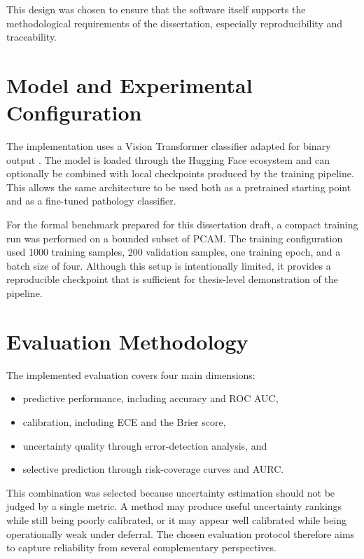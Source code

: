 This design was chosen to ensure that the software itself supports the methodological requirements of the dissertation, especially reproducibility and traceability.

\section{Model and Experimental Configuration}

The implementation uses a Vision Transformer classifier adapted for binary output \cite{dosovitskiy2021image}. The model is loaded through the Hugging Face ecosystem and can optionally be combined with local checkpoints produced by the training pipeline. This allows the same architecture to be used both as a pretrained starting point and as a fine-tuned pathology classifier.

For the formal benchmark prepared for this dissertation draft, a compact training run was performed on a bounded subset of PCAM. The training configuration used 1000 training samples, 200 validation samples, one training epoch, and a batch size of four. Although this setup is intentionally limited, it provides a reproducible checkpoint that is sufficient for thesis-level demonstration of the pipeline.

\section{Evaluation Methodology}

The implemented evaluation covers four main dimensions:

\begin{itemize}
    \item predictive performance, including accuracy and ROC AUC,
    \item calibration, including ECE and the Brier score,
    \item uncertainty quality through error-detection analysis, and
    \item selective prediction through risk-coverage curves and AURC.
\end{itemize}

This combination was selected because uncertainty estimation should not be judged by a single metric. A method may produce useful uncertainty rankings while still being poorly calibrated, or it may appear well calibrated while being operationally weak under deferral. The chosen evaluation protocol therefore aims to capture reliability from several complementary perspectives.

